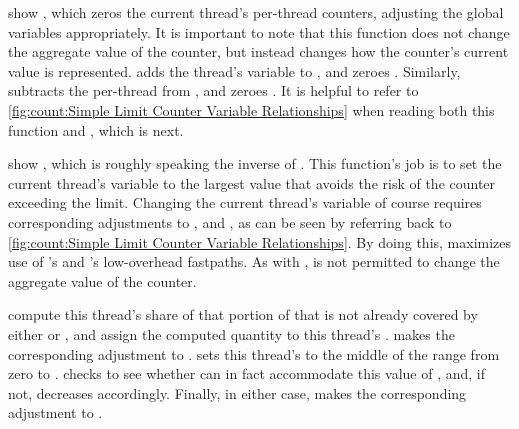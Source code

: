 \begin{fcvref}
 show ,
which zeros the current thread's
per-thread counters, adjusting the global variables appropriately.
It is important to note that this function does not change the aggregate
value of the counter, but instead changes how the counter's current value
is represented.
 adds the thread's  variable to ,
and  zeroes .
Similarly,  subtracts the per-thread  from
, and  zeroes .
It is helpful to refer to
\cref{fig:count:Simple Limit Counter Variable Relationships}
when reading both this function and , which is next.
\end{fcvref}

\begin{fcvref}
 show ,
which is roughly speaking
the inverse of .
This function's job is to set the current thread's
 variable to the largest value that avoids the risk
of the counter exceeding the  limit.
Changing the current thread's  variable of course
requires corresponding adjustments to , 
and , as can be seen by referring back to
\cref{fig:count:Simple Limit Counter Variable Relationships}.
By doing this,  maximizes use of
's and 's low-overhead fastpaths.
As with ,  is not permitted
to change the aggregate value of the counter.

 compute this thread's share of
that portion of
 that is not already covered by either
 or , and assign the
computed quantity to this thread's .
 makes the corresponding adjustment to .
 sets this thread's  to the middle of the range
from zero to .
 checks to see whether  can in fact accommodate
this value of , and, if not,
 decreases 
accordingly.
Finally, in either case,
 makes the corresponding adjustment to
.
\end{fcvref}

